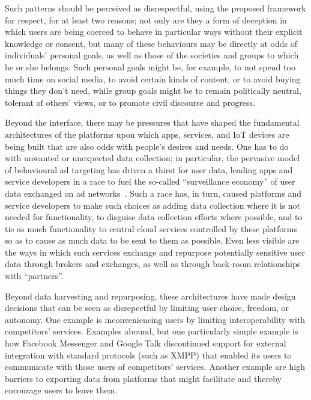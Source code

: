 \documentclass{IETpaper}
\begin{document}
Such patterns should be perceived as disrespectful, using the proposed framework for respect, for at least two reasons; not only are they a form of deception in which users are being coerced to behave in particular ways without their explicit knowledge or consent, but many of these behaviours may be directly at odds of individuals' personal goals, as well as those of the societies and groups to which he or she belongs.  Such personal goals might be, for example, to not spend too much time on social media, to avoid certain kinds of content, or to avoid buying things they don't need, while group goals might be to remain politically neutral, tolerant of others' views, or to promote civil discourse and progress.

Beyond the interface, there may be pressures that have shaped the fundamental architectures of the platforms upon which apps, services, and IoT devices are being built that are also odds with people's desires and needs.  One has to do with unwanted or unexpected data collection; in particular, the pervasive model of behavioural ad targeting has driven a thirst for user data, leading apps and service developers in a race to fuel the so-called ``surveillance economy'' of user data exchanged on ad networks~\cite{zuckerman2014internet}.  Such a race has, in turn, caused platforms and service developers to make such choices as adding data collection where it is not needed for functionality, to disguise data collection efforts where possible, and to tie as much functionality to central cloud services controlled by these platforms so as to cause as much data to be sent to them as possible.  Even less visible are the ways in which such services exchange and repurpose potentially sensitive user data through brokers and exchanges, as well as through back-room relationships with ``partners''.

Beyond data harvesting and repurposing, these architectures have made design decisions that can be seen as disrepectful by limiting user choice, freedom, or autonomy.  One example is inconveniencing users by limiting interoperability with competitors' services.  Examples abound, but one particularly simple example is how Facebook Messenger and Google Talk  discontinued support for external integration with standard protocols (such as XMPP) that enabled its users to communicate with those users of competitors' services.  Another example are high barriers to exporting data from platforms that might facilitate and thereby encourage users to leave them.
\end{document}
